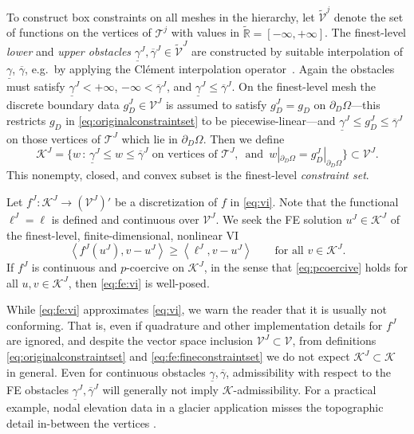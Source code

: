 \documentclass[review,hidelinks,onefignum,onetabnum]{siamart220329}
\newcommand{\RR}{\mathbb{R}}
\newcommand{\cK}{\mathcal{K}}
\newcommand{\ip}[2]{\left<#1,#2\right>}
\begin{document}
To construct box constraints on all meshes in the hierarchy, let $\tilde{\mathcal{V}}^j$ denote the set of functions on the vertices of $\mathcal{T}^j$ with values in $\tilde{\RR} = [-\infty,+\infty]$.  The finest-level \emph{lower} and \emph{upper obstacles} $\underline{\gamma}^J, \overline{\gamma}^J \in \tilde{\mathcal{V}}^J$ are constructed by suitable interpolation of $\underline{\gamma}$, $\overline{\gamma}$, e.g.~by applying the Cl\'ement interpolation operator~\cite{Carstensen2006}.  Again the obstacles must satisfy $\underline{\gamma}^J < +\infty$, $-\infty < \overline{\gamma}^J$, and $\underline{\gamma}^J \le \overline{\gamma}^J$.  On the finest-level mesh the discrete boundary data $g_D^J \in \mathcal{V}^J$ is assumed to satisfy $g_D^J = g_D$ on $\partial_D \Omega$---this restricts $g_D$ in \eqref{eq:originalconstraintset} to be piecewise-linear---and $\underline{\gamma}^J \le g_D^J \le \overline{\gamma}^J$ on those vertices of $\mathcal{T}^J$ which lie in $\partial_D \Omega$.  Then we define
\begin{equation}
\mathcal{K}^J = \big\{w\,:\,\underline{\gamma}^J \le w \le \overline{\gamma}^J \text{ on vertices of } \mathcal{T}^J, \, \text{ and } \, w|_{\partial_D\Omega} = g_D^J|_{\partial_D\Omega}\big\} \subset \mathcal{V}^J. \label{eq:fe:fineconstraintset}
\end{equation}
This nonempty, closed, and convex subset is the finest-level \emph{constraint set}.

Let $f^J:\mathcal{K}^J \to (\mathcal{V}^J)'$ be a discretization of $f$ in \eqref{eq:vi}.  Note that the functional $\ell^J=\ell$ is defined and continuous over $\mathcal{V}^J$.  We seek the FE solution $u^J \in \mathcal{K}^J$ of the finest-level, finite-dimensional, nonlinear VI
\begin{equation}
\ip{f^J(u^J)}{v-u^J} \ge \ip{\ell^J}{v-u^J} \qquad \text{for all } v\in \cK^J. \label{eq:fe:vi}
\end{equation}
If $f^J$ is continuous and $p$-coercive on $\mathcal{K}^J$, in the sense that \eqref{eq:pcoercive} holds for all $u,v \in \mathcal{K}^J$, then \eqref{eq:fe:vi} is well-posed.

While \eqref{eq:fe:vi} approximates \eqref{eq:vi}, we warn the reader that it is usually not conforming.  That is, even if quadrature and other implementation details for $f^J$ are ignored, and despite the vector space inclusion $\mathcal{V}^J \subset \mathcal{V}$, from definitions \eqref{eq:originalconstraintset} and \eqref{eq:fe:fineconstraintset} we do not expect $\mathcal{K}^J \subset \mathcal{K}$ in general.  Even for continuous obstacles $\underline{\gamma}, \overline{\gamma}$, admissibility with respect to the FE obstacles $\underline{\gamma}^J, \overline{\gamma}^J$ will generally not imply $\mathcal{K}$-admissibility.  For a practical example, nodal elevation data in a glacier application misses the topographic detail in-between the vertices \cite{Bueler2016}.
\end{document}
